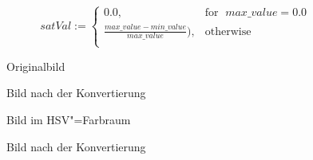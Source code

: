 \documentclass[a4paper,12pt,abstracton,titlepage]{scrartcl}
\begin{document}
\[
    satVal := \left\{\begin{array}{lr}
        0.0, & \text{for }\; max\_value = 0.0\\
        \frac {max\_value - min\_value} {max\_value}), & \text{otherwise }\; \\
        \end{array}\right.
  \]  


\begin{figure}[htbp]
\begin{minipage}[t]{0.48\textwidth}
  \begin{center}
    \caption{Originalbild}
    \label{originalScot}
  \end{center}
\end{minipage}
\begin{minipage}[t]{0.52\textwidth}
  \begin{center}
    \caption{Bild nach der Konvertierung}
    \label{rgb2hsv}
  \end{center}
\end{minipage}
\end{figure}



 

\begin{figure}[htbp]
\begin{minipage}[t]{0.48\textwidth}
  \begin{center}
    \caption{Bild im HSV"=Farbraum}
    \label{hsvVorher}
  \end{center}
\end{minipage}
\begin{minipage}[t]{0.52\textwidth}
  \begin{center}
    \caption{Bild nach der Konvertierung}
    \label{hsv2rgb}
  \end{center}
\end{minipage}
\end{figure}
\end{document}
